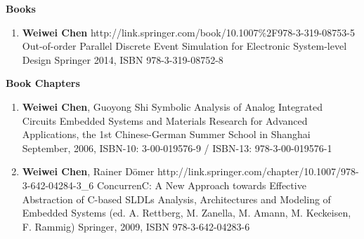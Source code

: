 \vspace{5mm}
{\textbf{\large Books}}
\vspace{-2mm}
\begin{enumerate}
	
\item 
	\mypubhl
	{\textbf{Weiwei Chen}}
	{http://link.springer.com/book/10.1007\%2F978-3-319-08753-5}
	{Out-of-order Parallel Discrete Event Simulation for Electronic System-level Design}
	{}
	{Springer}
	{2014, ISBN 978-3-319-08752-8}	
\end{enumerate}

\vspace{5mm}
{\textbf{\large Book Chapters}}
\vspace{-2mm}
\begin{enumerate}

\item 
	\mypub
	{\textbf{Weiwei Chen}, Guoyong Shi}
	{Symbolic Analysis of Analog Integrated Circuits}
	{}
	{Embedded Systems and Materials Research for Advanced Applications, the 1st Chinese-German Summer School in Shanghai}
	{September, 2006, ISBN-10: 3-00-019576-9 / ISBN-13: 978-3-00-019576-1}

\item 
	\mypubhl
	{\textbf{Weiwei Chen}, Rainer D\"{o}mer}
	{http://link.springer.com/chapter/10.1007/978-3-642-04284-3_6}
	{ConcurrenC: A New Approach towards Effective Abstraction of C-based SLDLs}
	{}
	{Analysis, Architectures and Modeling of Embedded Systems (ed. A. Rettberg, M. Zanella, M. Amann, M. Keckeisen, F. Rammig)}
	{Springer, 2009, ISBN 978-3-642-04283-6}
\end{enumerate}


